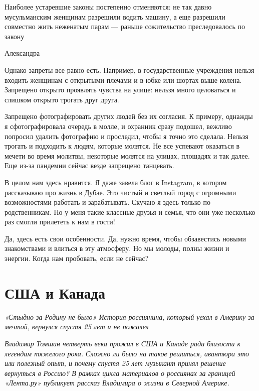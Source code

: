 \begin{fancyquotes}
    Наиболее устаревшие законы постепенно отменяются: не так давно мусульманским женщинам разрешили водить машину, а еще разрешили совместно жить неженатым парам — раньше сожительство преследовалось по закону

    \begin{flushright}
        Александра
    \end{flushright}
\end{fancyquotes}

Однако запреты все равно есть. Например, в государственные учреждения нельзя входить женщинам с открытыми плечами и в юбке или шортах выше колена. Запрещено открыто проявлять чувства на улице: нельзя много целоваться и слишком открыто трогать друг друга.

Запрещено фотографировать других людей без их согласия. К примеру, однажды я сфотографировала очередь в молле, и охранник сразу подошел, вежливо попросил удалить фотографию и проследил, чтобы я точно это сделала. Нельзя трогать и подходить к людям, которые молятся. Не все успевают оказаться в мечети во время молитвы, некоторые молятся на улицах, площадях и так далее. Еще из-за пандемии сейчас везде запрещено танцевать.

В целом нам здесь нравится. Я даже завела блог в Instagram, в котором рассказываю про жизнь в Дубае. Это чистый и светлый город с огромными возможностями работать и зарабатывать. Скучаю я здесь только по родственникам. Но у меня такие классные друзья и семья, что они уже несколько раз смогли прилететь к нам в гости!

Да, здесь есть свои особенности. Да, нужно время, чтобы обзавестись новыми знакомствами и влиться в эту атмосферу. Но мы молоды, полны жизни и энергии. Когда нам пробовать, если не сейчас?


\newpage
\section{США и Канада}

\textit{«Стыдно за Родину не было» История россиянина, который уехал в Америку за мечтой, вернулся спустя 25 лет и не пожалел}


\textit{Владимир Томшин четверть века прожил в США и Канаде ради близости к легендам тяжелого рока. Сложно ли было на такое решиться, авантюра это или полезный опыт, и почему спустя 25 лет музыкант принял решение вернуться в Россию? В рамках цикла материалов о россиянах за границей «Лента.ру» публикует рассказ Владимира о жизни в Северной Америке.}

